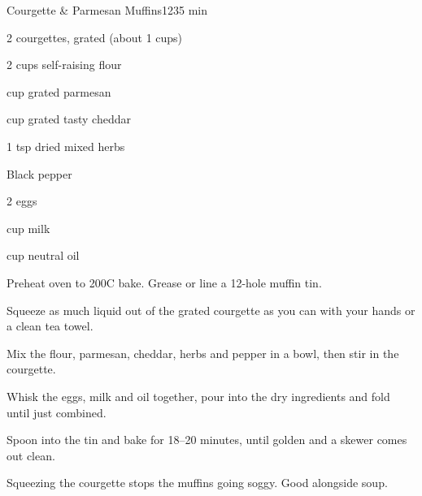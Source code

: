 \begin{recipebox}{Courgette \& Parmesan Muffins}{12}{35 min}
\begin{ingredients}
  \item 2 courgettes, grated (about 1 cups)
  \item 2 cups self-raising flour
  \item {} cup grated parmesan
  \item {} cup grated tasty cheddar
  \item 1 tsp dried mixed herbs
  \item Black pepper
  \item 2 eggs
  \item {} cup milk
  \item {} cup neutral oil
\end{ingredients}

\begin{method}
  \item Preheat oven to 200\degree C bake. Grease or line a 12-hole muffin tin.
  \item Squeeze as much liquid out of the grated courgette as you can with your hands or a clean tea towel.
  \item Mix the flour, parmesan, cheddar, herbs and pepper in a bowl, then stir in the courgette.
  \item Whisk the eggs, milk and oil together, pour into the dry ingredients and fold until just combined.
  \item Spoon into the tin and bake for 18--20 minutes, until golden and a skewer comes out clean.
\end{method}

\begin{notes}
Squeezing the courgette stops the muffins going soggy. Good alongside soup.
\end{notes}
\end{recipebox}
